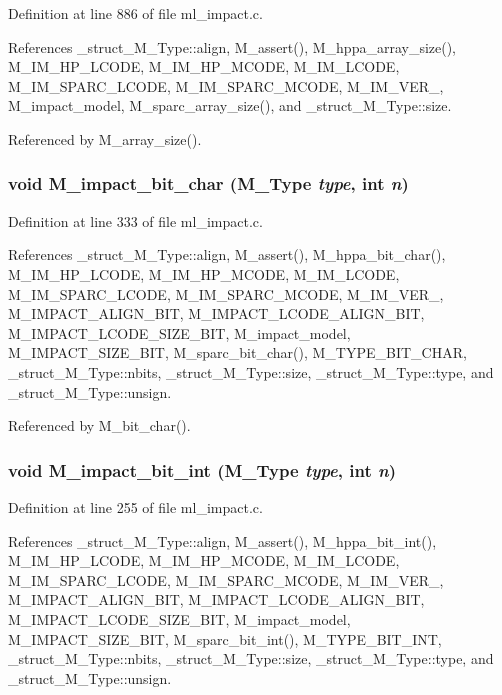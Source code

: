 Definition at line 886 of file ml\_\-impact.c.

References \_\-struct\_\-M\_\-Type::align, M\_\-assert(), M\_\-hppa\_\-array\_\-size(), M\_\-IM\_\-HP\_\-LCODE, M\_\-IM\_\-HP\_\-MCODE, M\_\-IM\_\-LCODE, M\_\-IM\_\-SPARC\_\-LCODE, M\_\-IM\_\-SPARC\_\-MCODE, M\_\-IM\_\-VER\_, M\_\-impact\_\-model, M\_\-sparc\_\-array\_\-size(), and \_\-struct\_\-M\_\-Type::size.

Referenced by M\_\-array\_\-size().
\subsubsection{\setlength{\rightskip}{0pt plus 5cm}void M\_\-impact\_\-bit\_\-char (\bf{M\_\-Type} {\em type}, int {\em n})}\label{ml__impact_8c_3170e2b73eda536371bef6cd734bcb26}




Definition at line 333 of file ml\_\-impact.c.

References \_\-struct\_\-M\_\-Type::align, M\_\-assert(), M\_\-hppa\_\-bit\_\-char(), M\_\-IM\_\-HP\_\-LCODE, M\_\-IM\_\-HP\_\-MCODE, M\_\-IM\_\-LCODE, M\_\-IM\_\-SPARC\_\-LCODE, M\_\-IM\_\-SPARC\_\-MCODE, M\_\-IM\_\-VER\_, M\_\-IMPACT\_\-ALIGN\_\-BIT, M\_\-IMPACT\_\-LCODE\_\-ALIGN\_\-BIT, M\_\-IMPACT\_\-LCODE\_\-SIZE\_\-BIT, M\_\-impact\_\-model, M\_\-IMPACT\_\-SIZE\_\-BIT, M\_\-sparc\_\-bit\_\-char(), M\_\-TYPE\_\-BIT\_\-CHAR, \_\-struct\_\-M\_\-Type::nbits, \_\-struct\_\-M\_\-Type::size, \_\-struct\_\-M\_\-Type::type, and \_\-struct\_\-M\_\-Type::unsign.

Referenced by M\_\-bit\_\-char().
\subsubsection{\setlength{\rightskip}{0pt plus 5cm}void M\_\-impact\_\-bit\_\-int (\bf{M\_\-Type} {\em type}, int {\em n})}\label{ml__impact_8c_e1fcafda2c971ef1031e21e5e315fa82}




Definition at line 255 of file ml\_\-impact.c.

References \_\-struct\_\-M\_\-Type::align, M\_\-assert(), M\_\-hppa\_\-bit\_\-int(), M\_\-IM\_\-HP\_\-LCODE, M\_\-IM\_\-HP\_\-MCODE, M\_\-IM\_\-LCODE, M\_\-IM\_\-SPARC\_\-LCODE, M\_\-IM\_\-SPARC\_\-MCODE, M\_\-IM\_\-VER\_, M\_\-IMPACT\_\-ALIGN\_\-BIT, M\_\-IMPACT\_\-LCODE\_\-ALIGN\_\-BIT, M\_\-IMPACT\_\-LCODE\_\-SIZE\_\-BIT, M\_\-impact\_\-model, M\_\-IMPACT\_\-SIZE\_\-BIT, M\_\-sparc\_\-bit\_\-int(), M\_\-TYPE\_\-BIT\_\-INT, \_\-struct\_\-M\_\-Type::nbits, \_\-struct\_\-M\_\-Type::size, \_\-struct\_\-M\_\-Type::type, and \_\-struct\_\-M\_\-Type::unsign.

